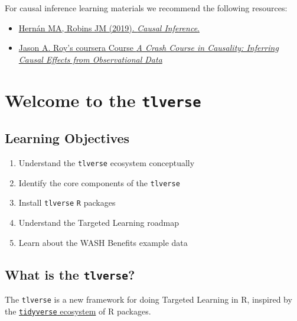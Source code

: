 \documentclass[
  12pt, krantz2,
]{book}
\newcommand{\passthrough}[1]{#1}
\providecommand{\tightlist}{%
  \setlength{\itemsep}{0pt}\setlength{\parskip}{0pt}}
\theoremstyle{definition}
\theoremstyle{definition}
\theoremstyle{definition}
\newcommand{\1}{\mathbbm{1}}
\begin{document}
For causal inference learning materials we recommend the following resources:

\begin{itemize}
\tightlist
\item
  \href{https://www.hsph.harvard.edu/miguel-hernan/causal-inference-book/}{Hernán MA, Robins JM (2019). \emph{Causal
  Inference}.}
\item
  \href{https://www.coursera.org/learn/crash-course-in-causality}{Jason A. Roy's coursera Course \emph{A Crash Course in Causality: Inferring
  Causal Effects from Observational Data}}
\end{itemize}

\hypertarget{tlverse}{%
\chapter{\texorpdfstring{Welcome to the \texttt{tlverse}}{Welcome to the tlverse}}\label{tlverse}}

\hypertarget{learning-objectives}{%
\section{Learning Objectives}\label{learning-objectives}}

\begin{enumerate}
\def\labelenumi{\arabic{enumi}.}
\tightlist
\item
  Understand the \passthrough{\lstinline!tlverse!} ecosystem conceptually
\item
  Identify the core components of the \passthrough{\lstinline!tlverse!}
\item
  Install \passthrough{\lstinline!tlverse!} \passthrough{\lstinline!R!} packages
\item
  Understand the Targeted Learning roadmap
\item
  Learn about the WASH Benefits example data
\end{enumerate}

\hypertarget{what-is-the-tlverse}{%
\section{\texorpdfstring{What is the \texttt{tlverse}?}{What is the tlverse?}}\label{what-is-the-tlverse}}

The \passthrough{\lstinline!tlverse!} is a new framework for doing Targeted Learning in R, inspired by
the \href{https://tidyverse.org}{\passthrough{\lstinline!tidyverse!} ecosystem} of R packages.
\end{document}
